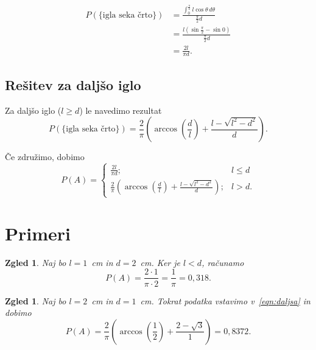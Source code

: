 \documentclass{article}
\newtheorem{zgled}[definicija]{Zgled}
\begin{document}
\begin{align*}
    P(\{\text{igla seka črto}\}) 
    &= \frac{\displaystyle{\int_{0}^{\frac{\pi}{2}} l\cos{\theta}\,d\theta}}{\frac{\pi}{2}d} \\
    &= \frac{ l (\sin{\frac{\pi}{2}} - \sin{0})}{\frac{\pi}{2}d}\\
     &= \frac{2 l}{\pi d}.
\end{align*}

    
\subsection{Rešitev za daljšo iglo}
Za daljšo iglo ($ l \geq d$) le navedimo rezultat
\begin{equation}
    \label{eqn:daljsa}
    P(\{\text{igla seka črto}\}) = 
    \frac{2}{\pi} \left(\arccos\left(\frac{d}{l}\right) + \frac{l - \sqrt{ l^2 - d^2}}{d} \right).
\end{equation}

Če združimo, dobimo
$$
   P(A) = \begin{cases}
    \frac{2 l}{\pi d}; & l \leq d \\
    \frac{2}{\pi} \left(\arccos\left(\frac{d}{l}\right) + \frac{l - \sqrt{ l^2 - d^2}}{d} \right); & l>d.
   \end{cases}
$$

\section{Primeri}
\begin{zgled}
Naj bo $l = 1$~cm in $d = 2$~cm. Ker je $l < d$, računamo
$$ P(A) = \frac{2 \cdot 1}{\pi \cdot 2} = \frac{1}{\pi} = 0,318. $$
\end{zgled}

\begin{zgled}
Naj bo $l = 2$~cm in $d = 1$~cm. Tokrat podatka vstavimo v~\eqref{eqn:daljsa} in dobimo
$$ P(A) = \frac{2}{\pi}\left(\arccos\left(\frac{1}{2}\right) + \frac{2 - \sqrt{3}}{1}\right) = 0,8372.$$
\end{zgled} 




\end{document}

